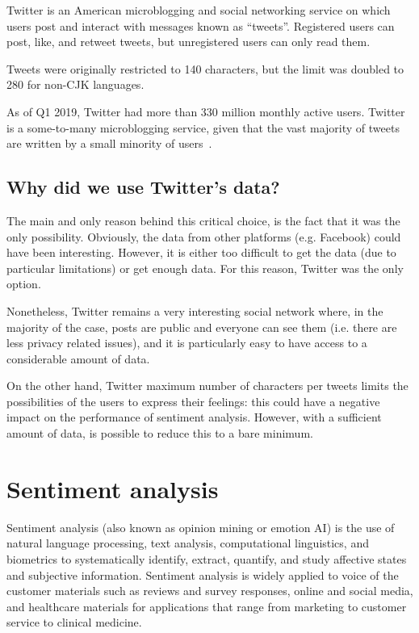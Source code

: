 Twitter is an American microblogging and social networking service on which users post and interact with messages known as “tweets”. Registered users can post, like, and retweet tweets, but unregistered users can only read them. 

Tweets were originally restricted to 140 characters, but the limit was doubled to 280 for non-CJK languages.

As of Q1 2019, Twitter had more than 330 million monthly active users. Twitter is a some-to-many microblogging service, given that the vast majority of tweets are written by a small minority of users~\cite{enwiki:1027840990}.

\subsection{Why did we use Twitter's data?}
\label{subsec:why_twitter}

The main and only reason behind this critical choice, is the fact that it was the only possibility. Obviously, the data from other platforms (e.g. Facebook) could have been interesting. However, it is either too difficult to get the data (due to particular limitations) or get enough data. For this reason, Twitter was the only option.

Nonetheless, Twitter remains a very interesting social network where, in the majority of the case, posts are public and everyone can see them (i.e. there are less privacy related issues), and it is particularly easy to have access to a considerable amount of data.

On the other hand, Twitter maximum number of characters per tweets limits the possibilities of the users to express their feelings: this could have a negative impact on the performance of sentiment analysis. However, with a sufficient amount of data, is possible to reduce this to a bare minimum. 

\section{Sentiment analysis}
\label{sec:sentiment-analysis}

Sentiment analysis (also known as opinion mining or emotion AI) is the use of natural language processing, text analysis, computational linguistics, and biometrics to systematically identify, extract, quantify, and study affective states and subjective information. Sentiment analysis is widely applied to voice of the customer materials such as reviews and survey responses, online and social media, and healthcare materials for applications that range from marketing to customer service to clinical medicine.


